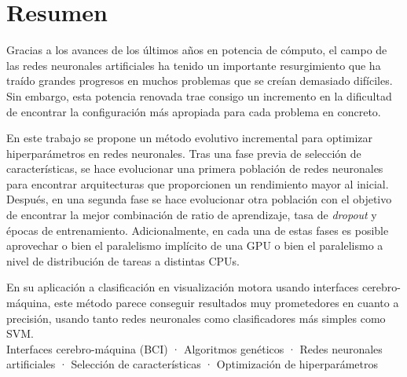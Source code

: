 \begingroup
\let\cleardoublepage\relax
\let\cleardoublepage\relax

\chapter*{Resumen}

Gracias a los avances de los últimos años en potencia de cómputo, el campo de las redes neuronales artificiales ha tenido un importante resurgimiento que ha traído grandes progresos en muchos problemas que se creían demasiado difíciles. Sin embargo, esta potencia renovada trae consigo un incremento en la dificultad de encontrar la configuración más apropiada para cada problema en concreto.

En este trabajo se propone un método evolutivo incremental para optimizar hiperparámetros en redes neuronales. Tras una fase previa de selección de características, se hace evolucionar una primera población de redes neuronales para encontrar arquitecturas que proporcionen un rendimiento mayor al inicial. Después, en una segunda fase se hace evolucionar otra población con el objetivo de encontrar la mejor combinación de ratio de aprendizaje, tasa de \textit{dropout} y épocas de entrenamiento. Adicionalmente, en cada una de estas fases es posible aprovechar o bien el paralelismo implícito de una GPU o bien el paralelismo a nivel de distribución de tareas a distintas CPUs.

En su aplicación a clasificación en visualización motora usando interfaces cerebro-máquina, este método parece conseguir resultados muy prometedores en cuanto a precisión, usando tanto redes neuronales como clasificadores más simples como SVM.\\

\noindent{} Interfaces cerebro-máquina (BCI) · Algoritmos genéticos · Redes neuronales artificiales · Selección de características · Optimización de hiperparámetros